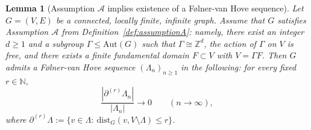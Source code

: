 \documentclass[a4paper,11pt]{article}
\theoremstyle{plain}
\newtheorem{lemma}[theorem]{Lemma}
\theoremstyle{definition}
\theoremstyle{remark}
\newcommand{\1}{\mathbf{1}}
\begin{document}
\begin{lemma}[Assumption $\mathcal{A}$ implies existence of a F\o lner-van Hove sequence]\label{lem:P_implies_vanhove}
Let $G=(V,E)$ be a connected, locally finite, infinite graph. Assume that $G$ satisfies
Assumption $\mathcal{A}$ from Definition~\ref{def:assumptionA}: namely, there exist an integer $d\ge 1$
and a subgroup $\Gamma\le \mathrm{Aut}(G)$ such that $\Gamma\cong \mathbb{Z}^d$, the action of $\Gamma$
on $V$ is free, and there exists a finite fundamental domain $F\subset V$ with $V=\Gamma F$.
Then $G$ admits a F\o lner-van Hove sequence $(\Lambda_n)_{n\ge 1}$ in the following:
for every fixed $r\in\mathbb{N}$,
\[
\frac{|\partial^{(r)}\Lambda_n|}{|\Lambda_n|}\longrightarrow 0 \qquad (n\to\infty),
\]
where $\partial^{(r)}\Lambda:=\{v\in \Lambda:\ \mathrm{dist}_G(v,V\setminus \Lambda)\le r\}$.
\end{lemma}
\end{document}
